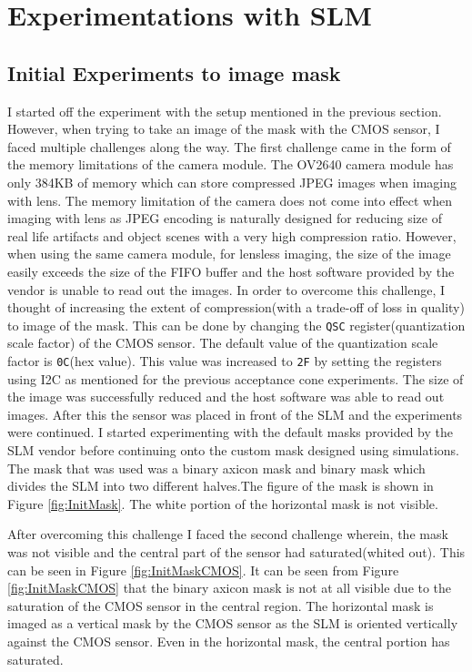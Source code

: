 \chapter{Experimentations with SLM}
\label{chp:SLM}
\section{Initial Experiments to image mask}
I started off the experiment with the setup mentioned in the previous section. However, when trying to take an image of the mask with the CMOS sensor, I faced multiple challenges along the  way. The first challenge came in the form of the memory limitations of the camera module. The OV2640 camera module has only 384KB of memory which can store compressed JPEG images when imaging with lens. The memory limitation of the camera does not come into effect when imaging with lens as JPEG encoding is naturally designed for reducing size of real life artifacts and object scenes with a very high compression ratio. However, when using the same camera module, for lensless imaging, the size of the image easily exceeds the size of the FIFO buffer and the host software provided by the vendor is unable to read out the images. In order to overcome this challenge, I thought of increasing the extent of compression(with a trade-off of loss in quality) to image of the mask. This can be done by changing the \texttt{QSC} register(quantization scale factor) \cite{} of the CMOS sensor. The default value of the quantization scale factor is \texttt{0C}(hex value). This value was increased to \texttt{2F} by setting the registers using I2C as mentioned for the previous acceptance cone experiments. The size of the image was successfully reduced and the host software was able to read out images. After this the sensor was placed in front of the SLM and the experiments were continued. I started experimenting with the default masks provided by the SLM vendor before continuing onto the custom mask designed using simulations. The mask that was used was a binary axicon mask and binary mask which divides the SLM into two different halves.The figure of the mask is shown in Figure \ref{fig:InitMask}. The white portion of the horizontal mask is not visible.

After overcoming this challenge I faced the second challenge wherein, the mask was not visible and the central part of the sensor had saturated(whited out). This can be seen in Figure \ref{fig:InitMaskCMOS}. It can be seen from Figure \ref{fig:InitMaskCMOS} that the binary axicon mask is not at all visible due to the saturation of the CMOS sensor in the central region. The horizontal mask is imaged as a vertical mask by the CMOS sensor as the SLM is oriented vertically against the CMOS sensor. Even in the horizontal mask, the central portion has saturated. 

